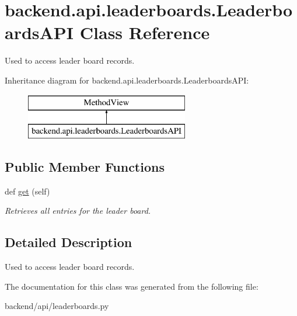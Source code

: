 \hypertarget{classbackend_1_1api_1_1leaderboards_1_1_leaderboards_a_p_i}{}\section{backend.\+api.\+leaderboards.\+Leaderboards\+A\+P\+I Class Reference}
\label{classbackend_1_1api_1_1leaderboards_1_1_leaderboards_a_p_i}


Used to access leader board records.  


Inheritance diagram for backend.\+api.\+leaderboards.\+Leaderboards\+A\+P\+I\+:\begin{figure}[H]
\begin{center}
\leavevmode
\includegraphics[height=2.000000cm]{classbackend_1_1api_1_1leaderboards_1_1_leaderboards_a_p_i}
\end{center}
\end{figure}
\subsection*{Public Member Functions}
\begin{DoxyCompactItemize}
\item 
\hypertarget{classbackend_1_1api_1_1leaderboards_1_1_leaderboards_a_p_i_a0b92d3c06d2a4ecababc0bda563b6855}{}def \hyperlink{classbackend_1_1api_1_1leaderboards_1_1_leaderboards_a_p_i_a0b92d3c06d2a4ecababc0bda563b6855}{get} (self)\label{classbackend_1_1api_1_1leaderboards_1_1_leaderboards_a_p_i_a0b92d3c06d2a4ecababc0bda563b6855}

\begin{DoxyCompactList}\small\item\em Retrieves all entries for the leader board. \end{DoxyCompactList}\end{DoxyCompactItemize}


\subsection{Detailed Description}
Used to access leader board records. 

The documentation for this class was generated from the following file\+:\begin{DoxyCompactItemize}
\item 
backend/api/leaderboards.\+py\end{DoxyCompactItemize}
